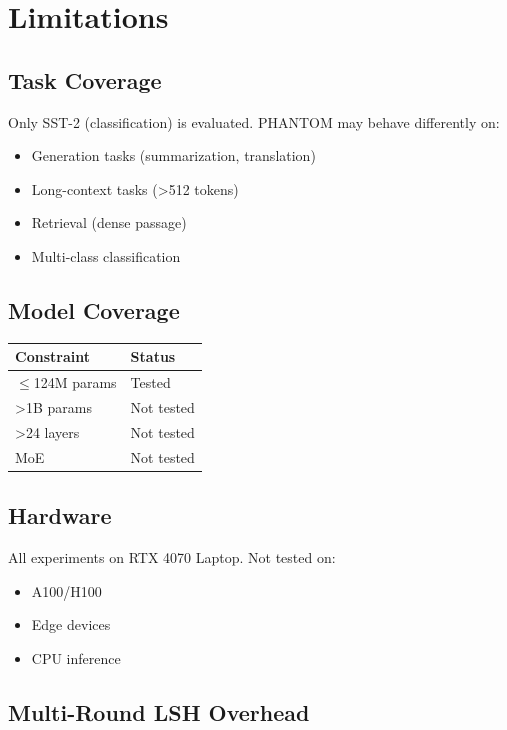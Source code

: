
\section{Limitations}

\subsection{Task Coverage}

Only SST-2 (classification) is evaluated. PHANTOM may behave differently on:
\begin{itemize}
\item Generation tasks (summarization, translation)
\item Long-context tasks (>512 tokens)
\item Retrieval (dense passage)
\item Multi-class classification

\end{itemize}
\subsection{Model Coverage}

\begin{table}[H]
\centering
\small
\begin{tabular}{ll}
\toprule
\textbf{Constraint} & \textbf{Status} \\
\midrule
$\le$124M params & Tested \\
>1B params & Not tested \\
>24 layers & Not tested \\
MoE & Not tested \\
\bottomrule
\end{tabular}
\end{table}

\subsection{Hardware}

All experiments on RTX 4070 Laptop. Not tested on:
\begin{itemize}
\item A100/H100
\item Edge devices
\item CPU inference

\end{itemize}
\subsection{Multi-Round LSH Overhead}

